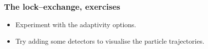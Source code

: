 \begin{frame}
  \frametitle{The lock--exchange, exercises}
  \begin{itemize}
  \item Experiment with the adaptivity options.
  \item Try adding some detectors to visualise the particle trajectories.
  \end{itemize}
\end{frame}

%
